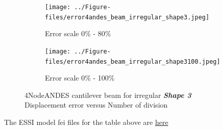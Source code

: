 \documentclass[fleqn,11pt]{article}
\begin{document}
\begin{figure}[H]
  \begin{subfigure}{0.5\textwidth}
    \centering
    \texttt{[image: ../Figure-files/error4andes\_beam\_irregular\_shape3.jpeg]}
    \caption{Error scale 0\% - 80\%}
  \end{subfigure}
  \begin{subfigure}{0.5\textwidth}
    \centering
    \texttt{[image: ../Figure-files/error4andes\_beam\_irregular\_shape3100.jpeg]}
    \caption{Error scale 0\% - 100\%}
  \end{subfigure}
  \captionsetup{justification=centering,margin=2cm}
  \caption{4NodeANDES cantilever beam for irregular \emph{\textbf{Shape 3}}\\
      Displacement error   versus   Number of division}
  \label{fig shape 3 4NodeANDES cantilever beam for irregular more elements}
\end{figure}


The ESSI model fei files for the table above are \href{https://github.com/yuan-energy/ESSI_Verification/blob/master/4NodeANDES/cantilever_irregular_element_cut/cantilever_irregular_element_cut.tar.gz?raw=true}{here}















\end{document}
